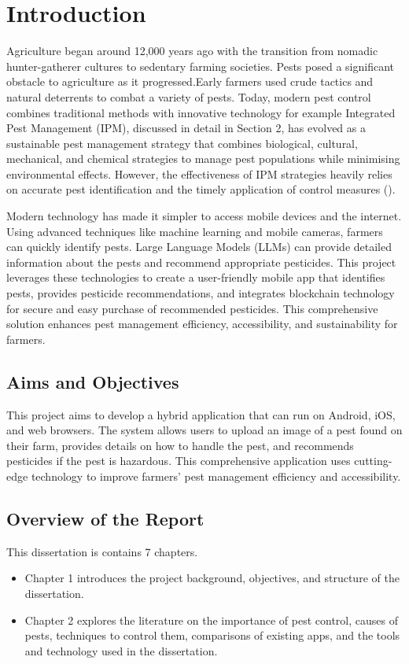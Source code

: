\chapter{Introduction}

Agriculture began around 12,000 years ago with the transition from nomadic hunter-gatherer cultures to sedentary farming societies. Pests posed a significant obstacle to agriculture as it progressed.Early farmers used crude tactics and natural deterrents to combat a variety of pests.
Today, modern pest control combines traditional methods with innovative technology for example Integrated Pest Management (IPM), discussed in detail in Section 2, has evolved as a sustainable pest management strategy that combines biological, cultural, mechanical, and chemical strategies to manage pest populations while minimising environmental effects. However, the effectiveness of IPM strategies heavily relies on accurate pest identification and the timely application of control measures
(\cite{wikipediacontributors_2019_history}).

Modern technology has made it simpler to access mobile devices and the internet. Using advanced techniques like machine learning and mobile cameras, farmers can quickly identify pests. Large Language Models (LLMs) can provide detailed information about the pests and recommend appropriate pesticides. This project leverages these technologies to create a user-friendly mobile app that identifies pests, provides pesticide recommendations, and integrates blockchain technology for secure and easy purchase of recommended pesticides. This comprehensive solution enhances pest management efficiency, accessibility, and sustainability for farmers.



\section{Aims and Objectives}

This project aims to develop a hybrid application that can run on Android, iOS, and web browsers. The system allows users to upload an image of a pest found on their farm, provides details on how to handle the pest, and recommends pesticides if the pest is hazardous. This comprehensive application uses cutting-edge technology to improve farmers' pest management efficiency and accessibility.

\section{Overview of the Report}

This dissertation is contains 7 chapters. 
\begin{itemize}
    \item Chapter 1 introduces the project background, objectives, and structure of the dissertation.
    \item Chapter 2 explores the literature on the importance of pest control, causes of pests, techniques to control them, comparisons of existing apps, and the tools and technology used in the dissertation.

\end{itemize}